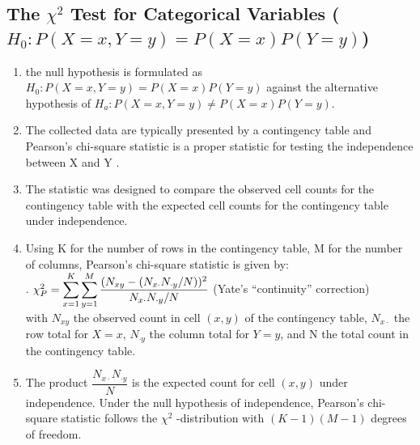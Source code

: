 \subsection{The $\chi^2$ Test for Categorical Variables ($H_0 : P(X = x, Y = y) = P(X = x) P(Y = y)$)}

\begin{enumerate}
    \item the null hypothesis is formulated as $H_0 : P(X = x, Y = y) = P(X = x) P(Y = y)$ against the alternative hypothesis of $H_a : P(X = x, Y = y) \neq P(X = x) P(Y = y)$.
    \hfill \cite{statistics/book/Statistics-for-Data-Scientists/Maurits-Kaptein}

    \item The collected data are typically presented by a contingency table and Pearson’s chi-square statistic is a proper statistic for testing the independence between X and Y . 
    \hfill \cite{statistics/book/Statistics-for-Data-Scientists/Maurits-Kaptein}
    
    \item The statistic was designed to compare the observed cell counts for the contingency table with the expected cell counts for the contingency table under independence.
    \hfill \cite{statistics/book/Statistics-for-Data-Scientists/Maurits-Kaptein}

    \item Using K for the number of rows in the contingency table, M for the number of columns, Pearson’s chi-square statistic is given by:
    \hfill \cite{statistics/book/Statistics-for-Data-Scientists/Maurits-Kaptein}
    \\
    .\hfill
    $
        \chi^2_P = \displaystyle\sum^K_{x=1} \displaystyle\sum^M_{y=1} \dfrac{(N_{x y} - (N_{x\cdot } N_{\cdot y} /N ))^2}{N_{x\cdot } N_{\cdot y} /N}
    $
    \hfill (Yate’s “continuity” correction)
    \hfill \cite{statistics/book/Statistics-for-Data-Scientists/Maurits-Kaptein}
    \\
    with $N_{x y}$ the observed count in cell $(x, y)$ of the contingency table, $N_{x\cdot }$ the row total for $X = x$, $N_{\cdot y}$ the column total for $Y = y$, and N the total count in the contingency table. 
    \hfill \cite{statistics/book/Statistics-for-Data-Scientists/Maurits-Kaptein}

    \item The product $\dfrac{N_{x\cdot } N_{\cdot y}}{N}$ is the expected count for cell $(x, y)$ under independence.
    Under the null hypothesis of independence, Pearson’s chi-square statistic follows the $\chi^2$ -distribution with $(K - 1)(M - 1)$ degrees of freedom.
    \hfill \cite{statistics/book/Statistics-for-Data-Scientists/Maurits-Kaptein}


\end{enumerate}
